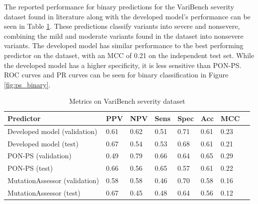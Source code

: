 \documentclass[11pt]{article}
\begin{document}
The reported performance for binary predictions for the VariBench severity dataset found in literature\cite{niroula2017predicting} along with the developed model's performance can be seen in Table \ref{table:severity_metrics}. These predictions classify variants into severe and nonsevere, combining the mild and moderate variants found in the dataset into nonsevere variants. The developed model has similar performance to the best performing predictor on the dataset, with an MCC of 0.21 on the independent test set. While the developed model has a higher specificity, it is less sensitive than PON-PS. ROC curves and PR curves can be seen for binary classification in Figure \ref{fig:ps_binary}. 

\begin{table}
\caption{Metrics on VariBench severity dataset}
\label{table:severity_metrics}
\begin{center}
\begin{tabular}{llllllll}
\toprule
Predictor & PPV & NPV & Sens & Spec & Acc & MCC \\
\midrule
Developed model (validation) & 0.61 & 0.62 & 0.51 & 0.71 & 0.61 & 0.23 \\
Developed model (test) & 0.67 & 0.54 & 0.53 & 0.68 & 0.61 & 0.21   \\
PON-PS (validation) & 0.49 & 0.79 & 0.66 & 0.64 & 0.65 & 0.29   \\
PON-PS (test) & 0.66 & 0.56 & 0.65 & 0.57 & 0.61 & 0.22  \\ 
MutationAssessor (validation) & 0.58 & 0.58 & 0.46 & 0.70 & 0.58 & 0.16 \\ 
MutationAssessor (test) & 0.67 & 0.45 & 0.48 & 0.64 & 0.56 & 0.12  \\ 
\bottomrule
\end{tabular}
\end{center}
\end{table}
\end{document}
